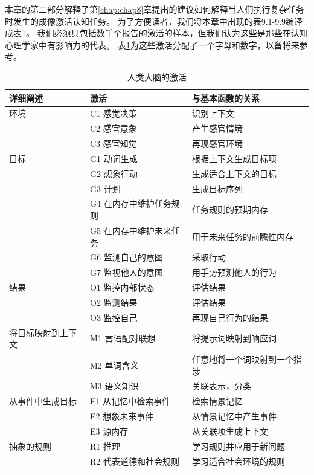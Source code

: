 本章的第二部分解释了第\ref{chap:chap8}章提出的建议如何解释当人们执行复杂任务时发生的成像激活认知任务。
为了方便读者，我们将本章中出现的表9.1-9.9编译成表\ref{tab:9_10}。
我们必须只包括数千个报告的激活的样本，但我们认为这些是那些在认知心理学家中有影响力的代表。
表\ref{tab:9_10}为这些激活分配了一个字母和数字，以备将来参考。


\begin{table}[htbp] 
	\newcommand{\tabincell}[2]{\begin{tabular}{@{}#1@{}}#2\end{tabular}} %
	\centering
	\caption{人类大脑的激活\label{tab:9_10}}
	\renewcommand\arraystretch{1.5}	%
	\begin{tabular}{lll}
		\toprule
		详细阐述 & 激活 & 与基本函数的关系\\
		\midrule
		环境 & C1 感觉决策 & 识别上下文  \\
		& C2 感官意象 & 产生感官情境 \\
		& C3 感官知觉 & 再现感官环境 \\
		目标 & G1 动词生成 & 根据上下文生成目标项  \\
		& G2 想象行动 & 生成适合上下文的目标 \\
		& G3 计划 & 生成目标序列 \\
		& G4 在内存中维护任务规则 & 任务规则的预期内存 \\
		& G5 在内存中维护未来任务 & 用于未来任务的前瞻性内存 \\
		& G6 监测自己的意图 & 采取行动 \\
		& G7 监视他人的意图 & 用手势预测他人的行为 \\
		结果 & O1 监控内部状态 & 评估结果  \\
		& O2 监测结果 & 评估结果 \\
		& O3 监控自己 & 再现自己行为的结果 \\
		将目标映射到上下文 & M1 言语配对联想 & 将提示词映射到响应词  \\
		& M2 单词含义 & 任意地将一个词映射到一个指涉 \\
		& M3 语义知识 & 关联表示，分类 \\
		从事件中生成目标 & E1 从记忆中检索事件& 检索情景记忆  \\
		& E2 想象未来事件 & 从情景记忆中产生事件 \\
		& E3 源内存 & 从关联项生成上下文 \\
		抽象的规则  & R1 推理 & 学习规则并应用于新问题  \\
		& R2 代表道德和社会规则 & 学习适合社会环境的规则 \\

		\bottomrule
		
	\end{tabular}%
\end{table}%


